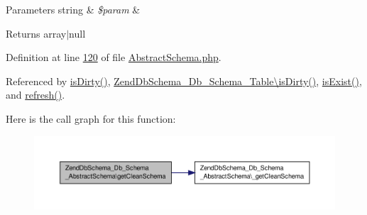 \begin{DoxyParams}[1]{Parameters}
string & {\em \$param} & \\
\hline
\end{DoxyParams}
\begin{DoxyReturn}{Returns}
array$|$null 
\end{DoxyReturn}


Definition at line \hyperlink{AbstractSchema_8php_source_l00120}{120} of file \hyperlink{AbstractSchema_8php_source}{Abstract\-Schema.\-php}.



Referenced by \hyperlink{AbstractSchema_8php_source_l00091}{is\-Dirty()}, \hyperlink{Table_8php_source_l00365}{Zend\-Db\-Schema\-\_\-\-Db\-\_\-\-Schema\-\_\-\-Table\textbackslash{}is\-Dirty()}, \hyperlink{AbstractSchema_8php_source_l00079}{is\-Exist()}, and \hyperlink{AbstractSchema_8php_source_l00138}{refresh()}.



Here is the call graph for this function\-:\nopagebreak
\begin{figure}[H]
\begin{center}
\leavevmode
\includegraphics[width=350pt]{classZendDbSchema__Db__Schema__AbstractSchema_a46da7a60c7e5fd605607afbc1dac4baa_cgraph}
\end{center}
\end{figure}




